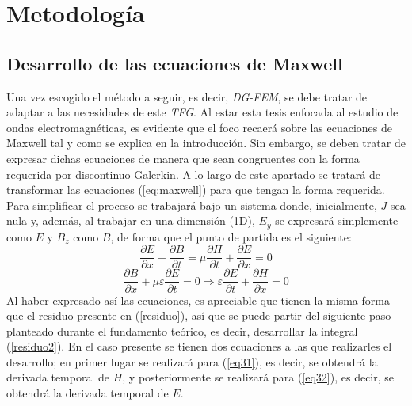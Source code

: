 \documentclass[11pt,a4paper,twoside,pdf]{article}
\numberwithin{equation}{section}
\begin{document}
\section{Metodología}
\subsection{Desarrollo de las ecuaciones de Maxwell}
Una vez escogido el método a seguir, es decir, \textit{DG-FEM}, se debe tratar de adaptar a las necesidades de este \textit{TFG}. Al estar esta tesis enfocada al estudio de ondas electromagnéticas, es evidente que el foco recaerá sobre las ecuaciones de Maxwell tal y como se explica en la introducción. Sin embargo, se deben tratar de expresar dichas ecuaciones de manera que sean congruentes con la forma requerida por discontinuo Galerkin. A lo largo de este apartado se tratará de transformar las ecuaciones (\ref{eq:maxwell}) para que tengan la forma requerida. Para simplificar el proceso se trabajará bajo un sistema donde, inicialmente, $J$ sea nula y, además, al trabajar en una dimensión (1D), $E_y$ se expresará simplemente como $E$ y $B_z$ como $B$, de forma que el punto de partida es el siguiente:
\begin{equation}
\frac{\partial E}{\partial x} +\frac{\partial B}{\partial t}=\mu\frac{\partial H}{\partial t}+\frac{\partial E}{\partial x}=0 \label{eq31}
\end{equation}
\begin{equation}
\frac{\partial B}{\partial x} + \mu \varepsilon \frac{\partial E}{\partial t}=0\Rightarrow\varepsilon \frac{\partial E}{\partial t}+\frac{\partial H}{\partial x} =0  \label{eq32}
\end{equation}
Al haber expresado así las ecuaciones, es apreciable que tienen la misma forma que el residuo presente en (\ref{residuo}), así que se puede partir del siguiente paso planteado durante el fundamento teórico, es decir, desarrollar la integral (\ref{residuo2}). En el caso presente se tienen dos ecuaciones a las que realizarles el desarrollo; en primer lugar se realizará para (\ref{eq31}), es decir, se obtendrá la derivada temporal de $H$, y posteriormente se realizará para (\ref{eq32}), es decir, se obtendrá la derivada temporal de $E$.
\end{document}
